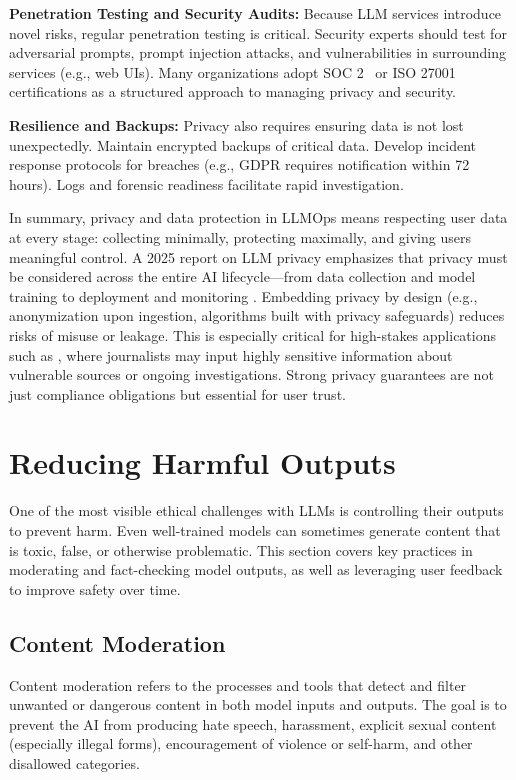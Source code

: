 \textbf{Penetration Testing and Security Audits:} Because LLM services introduce novel risks, regular penetration testing is critical. Security experts should test for adversarial prompts, prompt injection attacks, and vulnerabilities in surrounding services (e.g., web UIs). Many organizations adopt SOC 2~\cite{soc2} or ISO 27001~\cite{iso27001} certifications as a structured approach to managing privacy and security.

\textbf{Resilience and Backups:} Privacy also requires ensuring data is not lost unexpectedly. Maintain encrypted backups of critical data. Develop incident response protocols for breaches (e.g., GDPR requires notification within 72 hours). Logs and forensic readiness facilitate rapid investigation.

In summary, privacy and data protection in LLMOps means respecting user data at every stage: collecting minimally, protecting maximally, and giving users meaningful control. A 2025 report on LLM privacy emphasizes that privacy must be considered across the entire AI lifecycle---from data collection and model training to deployment and monitoring \cite{edpb2022}. Embedding privacy by design (e.g., anonymization upon ingestion, algorithms built with privacy safeguards) reduces risks of misuse or leakage. This is especially critical for high-stakes applications such as \ishtar{}, where journalists may input highly sensitive information about vulnerable sources or ongoing investigations. Strong privacy guarantees are not just compliance obligations but essential for user trust.

\section{Reducing Harmful Outputs}\label{sec:ethics-harm}

One of the most visible ethical challenges with LLMs is controlling their outputs to prevent harm. Even well-trained models can sometimes generate content that is toxic, false, or otherwise problematic. This section covers key practices in moderating and fact-checking model outputs, as well as leveraging user feedback to improve safety over time.

\subsection{Content Moderation}

Content moderation refers to the processes and tools that detect and filter unwanted or dangerous content in both model inputs and outputs. The goal is to prevent the AI from producing hate speech, harassment, explicit sexual content (especially illegal forms), encouragement of violence or self-harm, and other disallowed categories.

